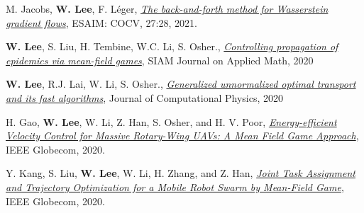 \begin{cvparagraph}
\begin{cvitems}
    \medskip
    \item M. Jacobs, \textbf{W. Lee}, F. Léger, \href{https://arxiv.org/pdf/2011.08151}{\textit{The back-and-forth method for Wasserstein gradient flows}}, {ESAIM: COCV}, 27:28, 2021.
    \medskip
    \item \textbf{W. Lee}, S. Liu, H. Tembine, W.C. Li, S. Osher., \href{https://www.researchgate.net/publication/341804278_Controlling_Propagation_of_epidemics_via_mean-field_games}{\textit{Controlling propagation of epidemics via mean-field games}}, {SIAM Journal on Applied Math}, 2020
    \medskip
    \item \textbf{W. Lee}, R.J. Lai, W. Li, S. Osher., \href{https://www.researchgate.net/publication/338990122_Generalized_Unnormalized_Optimal_Transport_and_its_fast_algorithms}{\textit{Generalized unnormalized optimal transport and its fast algorithms}}, {Journal of Computational Physics}, 2020
    \medskip
    \item H. Gao, \textbf{W. Lee}, W. Li, Z. Han, S. Osher, and H. V. Poor, \href{ftp://ftp.math.ucla.edu/pub/camreport/cam19-57.pdf}{\textit{Energy-efficient Velocity Control for Massive Rotary-Wing UAVs: A Mean Field Game Approach}}, {IEEE Globecom}, 2020.
    \medskip
    \item Y. Kang, S. Liu, \textbf{W. Lee}, W. Li, H. Zhang, and Z. Han, \href{https://ieeexplore.ieee.org/document/9322422}{\textit{Joint Task Assignment and Trajectory Optimization for a Mobile Robot Swarm by Mean-Field Game}}, {IEEE Globecom}, 2020.
  \end{cvitems}

\vspace{0.5cm}
\end{cvparagraph}